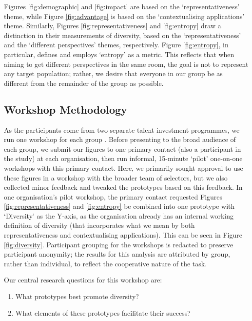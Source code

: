 Figures \ref{fig:demographic} and \ref{fig:impact} are based on the `representativeness' theme, while Figure \ref{fig:advantage} is based on the `contextualising applications' theme. Similarly, Figures \ref{fig:representativeness} and \ref{fig:entropy} draw a distinction in their measurements of diversity, based on the `representativeness' and the `different perspectives' themes, respectively. Figure \ref{fig:entropy}, in particular, defines and employs `entropy' as a metric. This reflects that when aiming to get different perspectives in the same room, the goal is not to represent any target population; rather, we desire that everyone in our group be as different from the remainder of the group as possible.

\subsection{Workshop Methodology}\label{ssec:methods2}
As the participants come from two separate talent investment programmes, we run one workshop for each group \cite{Buchenau_Suri_2000}. Before presenting to the broad audience of each group, we submit our figures to one primary contact (also a participant in the study) at each organisation, then run informal, 15-minute `pilot' one-on-one workshops with this primary contact. Here, we primarily sought approval to use these figures in a workshop with the broader team of selectors, but we also collected minor feedback and tweaked the prototypes based on this feedback. In one organisation's pilot workshop, the primary contact requested Figures \ref{fig:representativeness} and \ref{fig:entropy} be combined into one prototype with `Diversity' as the Y-axis, as the organisation already has an internal working definition of diversity (that incorporates what we mean by both representativeness and contextualising applications). This can be seen in Figure \ref{fig:diversity}. Participant grouping for the workshops is redacted to preserve participant anonymity; the results for this analysis are attributed by group, rather than individual, to reflect the cooperative nature of the task.

Our central research questions for this workshop are:

\begin{enumerate}
    \item What prototypes best promote diversity?
    \item What elements of these prototypes facilitate their success?
\end{enumerate}

